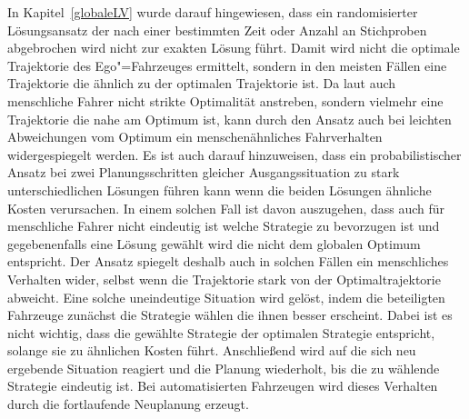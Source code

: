 In Kapitel~\ref{globaleLV} wurde darauf hingewiesen, dass ein randomisierter L\"osungsansatz der nach einer bestimmten Zeit oder Anzahl an Stichproben abgebrochen wird nicht zur exakten L\"osung f\"uhrt.
Damit wird nicht die optimale Trajektorie des Ego"=Fahrzeuges ermittelt, sondern in den meisten F\"allen eine Trajektorie die \"ahnlich zu der optimalen Trajektorie ist.
Da laut \cite{Naumann2018} auch menschliche Fahrer nicht strikte Optimalit\"at anstreben, sondern vielmehr eine Trajektorie die nahe am Optimum ist, kann durch den Ansatz auch bei leichten Abweichungen vom Optimum ein menschen\"ahnliches Fahrverhalten widergespiegelt werden.
Es ist auch darauf hinzuweisen, dass ein probabilistischer Ansatz bei zwei Planungsschritten gleicher Ausgangssituation zu stark unterschiedlichen L\"osungen f\"uhren kann wenn die beiden L\"osungen \"ahnliche Kosten verursachen.
In einem solchen Fall ist davon auszugehen, dass auch f\"ur menschliche Fahrer nicht eindeutig ist welche Strategie zu bevorzugen ist und gegebenenfalls eine L\"osung gew\"ahlt wird die nicht dem globalen Optimum entspricht.
Der Ansatz spiegelt deshalb auch in solchen F\"allen ein menschliches Verhalten wider, selbst wenn die Trajektorie stark von der Optimaltrajektorie abweicht.
Eine solche uneindeutige Situation wird gel\"ost, indem die beteiligten Fahrzeuge zun\"achst die Strategie w\"ahlen die ihnen besser erscheint.
Dabei ist es nicht wichtig, dass die gew\"ahlte Strategie der optimalen Strategie entspricht, solange sie zu \"ahnlichen Kosten f\"uhrt.
Anschlie{\ss}end wird auf die sich neu ergebende Situation reagiert und die Planung wiederholt, bis die zu w\"ahlende Strategie eindeutig ist.
Bei automatisierten Fahrzeugen wird dieses Verhalten durch die fortlaufende Neuplanung erzeugt.


